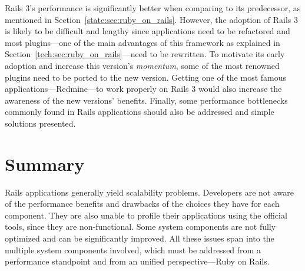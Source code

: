 Rails 3's performance is significantly better when comparing to its predecessor, as mentioned in Section~\ref{state:sec:ruby_on_rails}. However, the adoption of Rails 3 is likely to be difficult and lengthy since applications need to be refactored and most plugins---one of the main advantages of this framework as explained in Section~\ref{tech:sec:ruby_on_rails}---need to be rewritten. To motivate its early adoption and increase this version's \textit{momentum}, some of the most renowned plugins need to be ported to the new version. Getting one of the most famous applications---Redmine---to work properly on Rails 3 would also increase the awareness of the new versions' benefits. Finally, some performance bottlenecks commonly found in Rails applications should also be addressed and simple solutions presented.

\section{Summary}
Rails applications generally yield scalability problems. Developers are not aware of the performance benefits and drawbacks of the choices they have for each component. They are also unable to profile their applications using the official tools, since they are non-functional. Some system components are not fully optimized and can be significantly improved. All these issues span into the multiple system components involved, which must be addressed from a performance standpoint and from an unified perspective---Ruby on Rails.
